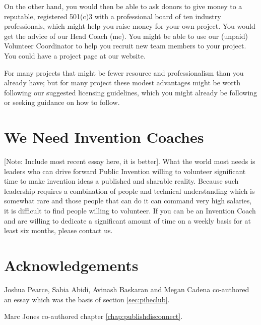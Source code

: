 \documentclass[
	fontsize=10pt, %
	twoside=false, %
	secnumdepth=1, %
]{kaobook}
\begin{document}
On the other hand, you would then be able to ask donors to give money to a reputable, registered 501(c)3 with a professional board of ten industry
professionals, which might help you raise money for your own project.
You would get the advice of our Head Coach (me). You might be able to use our (unpaid) Volunteer Coordinator to help you recruit new team members to your project.
You could have a project page at our website.

For many projects that might be fewer resource and professionalism than you already have; but for many project these modest advantages might be worth following
our suggested licensing guidelines, which you might already be following or seeking guidance on how to follow.


\chapter{We Need Invention Coaches}

[Note: Include most recent essay here, it is better].
What the world most needs is leaders who can drive forward
Public Invention willing to volunteer significant time
to make invention ideas a published and sharable reality.
Because such leadership requires a combination of people and
technical understanding which is somewhat rare and those
people that can do it can command very high salaries,
it is difficult to find people willing to volunteer.
If you can be an Invention Coach and are willing to
dedicate a significant amount of time on a weekly basis
for at least six months, please contact us.


\appendix %



\chapter*{Acknowledgements}

Joshua Pearce, Sabia Abidi, Avinash Baskaran and Megan Cadena co-authored an essay which was the basis of section \ref{sec:piheclub}.

Marc Jones co-authored chapter \ref{chap:publishdisconnect}.


\backmatter %
\end{document}
